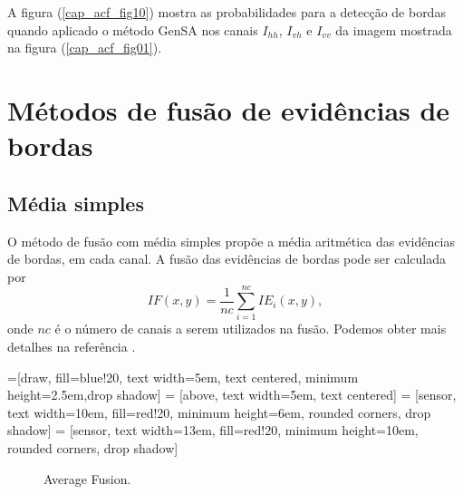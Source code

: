 \documentclass[conference]{IEEEtran}
\begin{document}
	A figura (\ref{cap_acf_fig10}) mostra as probabilidades para a detecção de bordas quando aplicado o método GenSA nos canais $I_{hh}$, $I_{vh}$ e $I_{vv}$ da imagem mostrada na figura (\ref{cap_acf_fig01}).  

\section{Métodos de fusão de evidências de bordas}\label{sec_06}
\subsection{Média simples}
O método de fusão com média simples propõe a média aritmética das evidências de bordas, em cada canal. A fusão das evidências de bordas pode ser calculada por
\begin{equation}
	IF(x,y)=\frac{1}{nc}\sum_{i=1}^{nc}IE_i(x,y),
\end{equation}
onde $nc$ é o número de canais a serem utilizados na fusão. Podemos obter mais detalhes na referência \cite{mit}.


%
=[draw, fill=blue!20, text width=5em, 
    text centered, minimum height=2.5em,drop shadow]
 = [above, text width=5em, text centered]
 = [sensor, text width=10em, fill=red!20, 
    minimum height=6em, rounded corners, drop shadow]
 = [sensor, text width=13em, fill=red!20, 
    minimum height=10em, rounded corners, drop shadow]
\def\blockdist{2.3}
\def\edgedist{2.5}
	\begin{figure}[htb!]
\centering
{}
	\caption{Average Fusion.}
\label{fig5}
\end{figure}
\end{document}
